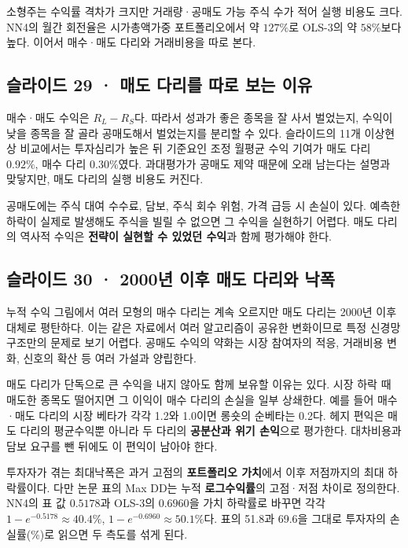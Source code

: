 \documentclass[11pt,a4paper]{article}
\begin{document}
소형주는 수익률 격차가 크지만 거래량·공매도 가능 주식 수가 적어 실행 비용도 크다. NN4의 월간 회전율은 시가총액가중 포트폴리오에서 약 $127\%$로 OLS-3의 약 $58\%$보다 높다. 이어서 매수·매도 다리와 거래비용을 따로 본다.\par

\subsection{슬라이드 29 · 매도 다리를 따로 보는 이유}
매수·매도 수익은 $R_L-R_S$다. 따라서 성과가 좋은 종목을 잘 사서 벌었는지, 수익이 낮을 종목을 잘 골라 공매도해서 벌었는지를 분리할 수 있다. 슬라이드의 11개 이상현상 비교에서는 투자심리가 높은 뒤 기준요인 조정 월평균 수익 기여가 매도 다리 $0.92\%$, 매수 다리 $0.30\%$였다. 과대평가가 공매도 제약 때문에 오래 남는다는 설명과 맞닿지만, 매도 다리의 실행 비용도 커진다.\par

공매도에는 주식 대여 수수료, 담보, 주식 회수 위험, 가격 급등 시 손실이 있다. 예측한 하락이 실제로 발생해도 주식을 빌릴 수 없으면 그 수익을 실현하기 어렵다. 매도 다리의 역사적 수익은 \textbf{전략이 실현할 수 있었던 수익}과 함께 평가해야 한다.\par

\subsection{슬라이드 30 · 2000년 이후 매도 다리와 낙폭}
누적 수익 그림에서 여러 모형의 매수 다리는 계속 오르지만 매도 다리는 2000년 이후 대체로 평탄하다. 이는 같은 자료에서 여러 알고리즘이 공유한 변화이므로 특정 신경망 구조만의 문제로 보기 어렵다. 공매도 수익의 약화는 시장 참여자의 적응, 거래비용 변화, 신호의 확산 등 여러 가설과 양립한다.\par

매도 다리가 단독으로 큰 수익을 내지 않아도 함께 보유할 이유는 있다. 시장 하락 때 매도한 종목도 떨어지면 그 이익이 매수 다리의 손실을 일부 상쇄한다. 예를 들어 매수·매도 다리의 시장 베타가 각각 1.2와 1.0이면 롱숏의 순베타는 0.2다. 헤지 편익은 매도 다리의 평균수익뿐 아니라 두 다리의 \textbf{공분산과 위기 손익}으로 평가한다. 대차비용과 담보 요구를 뺀 뒤에도 이 편익이 남아야 한다.\par

투자자가 겪는 최대낙폭은 과거 고점의 \textbf{포트폴리오 가치}에서 이후 저점까지의 최대 하락률이다. 다만 논문 표의 Max DD는 누적 \textbf{로그수익률}의 고점·저점 차이로 정의한다. NN4의 표 값 $0.5178$과 OLS-3의 $0.6960$을 가치 하락률로 바꾸면 각각 $1-e^{-0.5178}\approx40.4\%$, $1-e^{-0.6960}\approx50.1\%$다. 표의 51.8과 69.6을 그대로 투자자의 손실률(\%)로 읽으면 두 측도를 섞게 된다.\par
\end{document}
